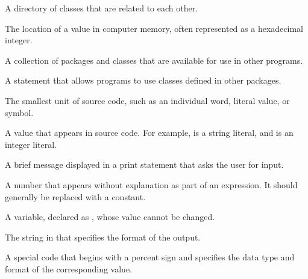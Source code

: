 \begin{description}

A directory of classes that are related to each other.

The location of a value in computer memory, often represented as a hexadecimal integer.

A collection of packages and classes that are available for use in other programs.





A statement that allows programs to use classes defined in other packages.

The smallest unit of source code, such as an individual word, literal value, or symbol.



A value that appears in source code.
For example,  is a string literal, and  is an integer literal.

A brief message displayed in a print statement that asks the user for input.

A number that appears without explanation as part of an expression.
It should generally be replaced with a constant.

A variable, declared as , whose value cannot be changed.

The string in  that specifies the format of the output.

A special code that begins with a percent sign and specifies the data type and format of the corresponding value.


\end{description}
